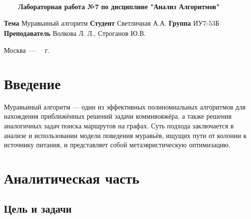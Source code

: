 \documentclass[a4paper,14pt, unknownkeysallowed]{extreport}
\begin{document}
\begin{titlepage}
	
	\begin{center}
		\noindent\begin{minipage}{1.3\textwidth}\centering
		\Large\textbf{   ~~~ Лабораторная работа №7}\newline
		\textbf{по дисциплине "Анализ Алгоритмов"}\newline\newline\newline
		\end{minipage}
	\end{center}
	
	\noindent\textbf{Тема} 			$\underline{\text{Муравьиный алгоритм}}$\newline\newline
	\noindent\textbf{Студент} 		$\underline{\text{Светличная А.А.}}$\newline\newline
	\noindent\textbf{Группа} 		$\underline{\text{ИУ7-53Б}}$\newline\newline
	\noindent\textbf{Преподаватель} $\underline{\text{Волкова Л. Л., Строганов Ю.В.}}$\newline
	
	\begin{center}
		\vfill
		Москва~---~\the\year
		~г.
	\end{center}
	\restoregeometry
\end{titlepage}
	
	\setcounter{page}{2}
	\tableofcontents
	
\newpage
\chapter*{Введение}
	

Муравьиный алгоритм --- один из эффективных полиномиальных алгоритмов для нахождения приближённых решений задачи коммивояжёра, а также решения аналогичных задач поиска маршрутов на графах. Суть подхода заключается в анализе и использовании модели поведения муравьёв, ищущих пути от колонии к источнику питания, и представляет собой метаэвристическую оптимизацию.
	
\chapter{Аналитическая часть}
	
\section{Цель и задачи}
\end{document}
